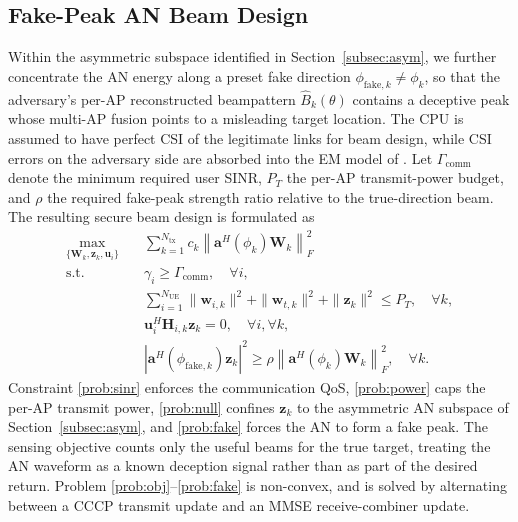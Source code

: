 \documentclass[lettersize,journal]{IEEEtran}
\begin{document}
\subsection{Fake-Peak AN Beam Design}
Within the asymmetric subspace identified in Section~\ref{subsec:asym}, we further concentrate the AN energy along a preset fake direction $\phi_{\mathrm{fake},k}\neq\phi_k$, so that the adversary's per-AP reconstructed beampattern $\widehat{B}_k(\theta)$ contains a deceptive peak whose multi-AP fusion points to a misleading target location. The CPU is assumed to have perfect CSI of the legitimate links for beam design, while CSI errors on the adversary side are absorbed into the EM model of \cite{dasilva2023multistaticcf}. Let $\Gamma_{\mathrm{comm}}$ denote the minimum required user SINR, $P_T$ the per-AP transmit-power budget, and $\rho$ the required fake-peak strength ratio relative to the true-direction beam. The resulting secure beam design is formulated as
\begin{subequations}
\begin{align}
\max_{\{\mathbf{W}_k,\mathbf{z}_k,\mathbf{u}_i\}} \quad & \sum_{k=1}^{N_{\mathrm{tx}}}c_k\left\|\mathbf{a}^H(\phi_k)\mathbf{W}_k\right\|_F^2 \label{prob:obj}\\
\text{s.t.}\quad & \gamma_i\ge \Gamma_{\mathrm{comm}},\quad \forall i, \label{prob:sinr}\\
& \textstyle\sum_{i=1}^{N_{\mathrm{UE}}}\|\mathbf{w}_{i,k}\|^2+\|\mathbf{w}_{t,k}\|^2+\|\mathbf{z}_k\|^2\le P_T,\quad \forall k, \label{prob:power}\\
& \mathbf{u}_i^H\mathbf{H}_{i,k}\mathbf{z}_k=0,\quad \forall i,\forall k, \label{prob:null}\\
& \left|\mathbf{a}^H(\phi_{\mathrm{fake},k})\mathbf{z}_k\right|^2 \ge \rho\left\|\mathbf{a}^H(\phi_k)\mathbf{W}_k\right\|_F^2,\quad \forall k. \label{prob:fake}
\end{align}
\end{subequations}
Constraint \eqref{prob:sinr} enforces the communication QoS, \eqref{prob:power} caps the per-AP transmit power, \eqref{prob:null} confines $\mathbf{z}_k$ to the asymmetric AN subspace of Section~\ref{subsec:asym}, and \eqref{prob:fake} forces the AN to form a fake peak. The sensing objective counts only the useful beams for the true target, treating the AN waveform as a known deception signal rather than as part of the desired return. Problem \eqref{prob:obj}--\eqref{prob:fake} is non-convex, and is solved by alternating between a CCCP transmit update and an MMSE receive-combiner update.
\end{document}
